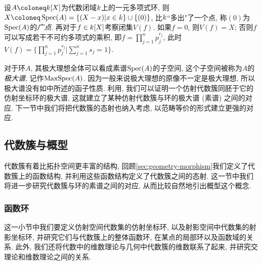 \begin{example}
  设$A\coloneq\kk [X]$为代数闭域$k$上的一元多项式环, 则$X\coloneq \Spec (A)=\{(X-x)\vert x\in \kk\}\cup \{(0)\}$, 比$k$``多出"了一个点, 称$(0)$为$\operatorname{Spec} (A)$的\emph{广点}. 再对于$f\in k [X]$考察闭集$V(f)$. 如果$f=0$, 则$V(f)=X$; 否则$f$可以写成若干不可约多项式的乘积, 即$f=\prod_{j=1}^np_{j}^{r_j}$, 此时$V(f)=\{\prod_{j=1}^np_j^{s_j}\vert \sum_{j=1}^ns_j=1\}$.
\end{example}

对于环$A$, 其极大理想全体可以看成素谱$\operatorname{Spec} (A)$的子空间, 这个子空间被称为$A$的\emph{极大谱}, 记作$\operatorname{MaxSpec} (A)$. 因为一般来说极大理想的原像不一定是极大理想, 所以极大谱没有如中所述的函子性质. 利用, 我们可以证明一个仿射代数簇同胚于它的仿射坐标环的极大谱, 这就建立了某种仿射代数簇与环的极大谱 (素谱) 之间的对应. 下一节中我们将把代数簇的态射也纳入考虑, 以范畴等价的形式建立更强的对应.

\subsection{代数簇与概型}\label{sec:ag-affinescheme}

代数簇有着比拓扑空间更丰富的结构, 回顾\ref{sec:geometry-morphism}我们定义了代数簇上的函数结构, 并利用这些函数结构定义了代数簇之间的态射. 这一节中我们将进一步研究代数簇与环的素谱之间的对应, 从而比较自然地引出概型这个概念.


\subsubsection{函数环}\label{sec:ag-functionrings}

这一小节中我们要定义仿射空间代数集的仿射坐标环, 以及射影空间中代数集的射影坐标环, 并研究它们与代数簇上的整体函数环, 在某点的局部环以及函数域的关系. 此外, 我们还将代数中的维数理论与几何中代数簇的维数联系了起来, 并研究交理论和维数理论之间的关系.

